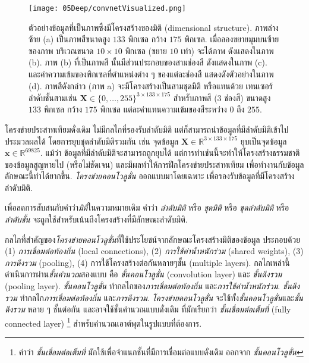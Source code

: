 %
\begin{figure}
	\begin{center}
		\texttt{[image: 05Deep/convnetVisualized.png]}
		\caption[โครงสร้างของมิติ]{ตัวอย่างข้อมูลที่เป็นภาพซึ่งมีโครงสร้างของมิติ (dimensional structure).
			ภาพล่างซ้าย (a) เป็นภาพสีขนาดสูง $133$ พิกเซล กว้าง $175$ พิกเซล.
			เมื่อลองขยายมุมบนซ้ายของภาพ บริเวณขนาด $10\times10$ พิกเซล (ขยาย $10$ เท่า) จะได้ภาพ ดังแสดงในภาพ (b).
			ภาพ (b) ที่เป็นภาพสี นั้นมีส่วนประกอบของสามช่องสี ดังแสดงในภาพ (c).
			และค่าความเข้มของพิกเซลที่ตำแหน่งต่าง ๆ ของแต่ละช่องสี แสดงดังตัวอย่างในภาพ (d).
			ภาพสีดังกล่าว (ภาพ a) จะมีโครงสร้างเป็นสามชุดมิติ หรือแทนด้วย เทนเซอร์ลำดับชั้นสามเช่น $\bm{X} \in \{0, \ldots, 255\}^{3 \times 133 \times 175}$ สำหรับภาพสี ($3$ ช่องสี) ขนาดสูง $133$ พิกเซล กว้าง $175$ พิกเซล แต่ละค่าแทนความเข้มของสีระหว่าง $0$ ถึง $255$.
		}
		\label{fig: deep image showing dimension structure}
	\end{center}
\end{figure}
%


%
โครงข่ายประสาทเทียมดั่งเดิม ไม่มีกลไกที่รองรับลำดับมิติ แต่ก็สามารถนำข้อมูลที่มีลำดับมิติเข้าไปประมวลผลได้
โดยการยุบชุดลำดับมิติรวมกัน เช่น จุดข้อมูล $\bm{X} \in \mathbb{R}^{3 \times 133 \times 175}$ ยุบเป็นจุดข้อมูล $\bm{x} \in \mathbb{R}^{69825}$.
%
%
แม้ว่า ข้อมูลที่มีลำดับมิติจะสามารถถูกยุบได้ แต่การทำเช่นนี้จะทำให้โครงสร้างธรรมชาติของข้อมูลสูญหายไป (หรือไม่ชัดเจน)
และมีผลทำให้การฝึกโครงข่ายประสาทเทียม เพื่อทำงานกับข้อมูลลักษณะนี้ทำได้ยากขึ้น.
\textit{โครงข่ายคอนโวลูชั่น} ออกแบบมาโดยเฉพาะ
เพื่อรองรับข้อมูลที่มีโครงสร้างลำดับมิติ.

เพื่อลดการสับสนกับคำว่า\textit{มิติ}ในความหมายเดิม
คำว่า \textit{ลำดับมิติ} หรือ \textit{ชุดมิติ} หรือ \textit{ชุดลำดับมิติ}
หรือ \textit{ลำดับชั้น}
จะถูกใช้สำหรับเน้นถึงโครงสร้างที่มีลักษณะลำดับมิติ.

กลไกที่สำคัญของ\textit{โครงข่ายคอนโวลูชั่น}ที่ใช้ประโยชน์จากลักษณะโครงสร้างมิติของข้อมูล ประกอบด้วย
(1) \textit{การเชื่อมต่อท้องถิ่น} (local connections),
(2) \textit{การใช้ค่าน้ำหนักร่วม} (shared weights),
(3) \textit{การดึงรวม} (pooling),
(4) การใช้โครงสร้างต่อกันหลายๆชั้น (multiple layers). %
กลไกเหล่านี้ ดำเนินการผ่าน\textit{ชั้นคำนวณ}สองแบบ คือ \textit{ชั้นคอนโวลูชั่น} (convolution layer) และ \textit{ชั้นดึงรวม} (pooling layer).
\textit{ชั้นคอนโวลูชั่น}
ทำกลไกของ\textit{การเชื่อมต่อท้องถิ่น} และ\textit{การใช้ค่าน้ำหนักร่วม}.
\textit{ชั้นดึงรวม}
ทำกลไก\textit{การเชื่อมต่อท้องถิ่น} และ\textit{การดึงรวม}.
\textit{โครงข่ายคอนโวลูชั่น} จะใช้ทั้ง\textit{ชั้นคอนโวลูชั่น}และ\textit{ชั้นดึงรวม} หลาย ๆ ชั้นต่อกัน
และอาจใช้ชั้นคำนวณแบบดั่งเดิม 
ที่มักเรียกว่า \textit{ชั้นเชื่อมต่อเต็มที่} (fully connected layer)%
%
%
\footnote{%
	คำว่า \textit{ชั้นเชื่อมต่อเต็มที่} มักใช้เพื่อจำแนกชั้นที่มีการเชื่อมต่อแบบดั่งเดิม ออกจาก \textit{ชั้นคอนโวลูชั่น}
} 
สำหรับคำนวณเอาต์พุตในรูปแบบที่ต้องการ.

